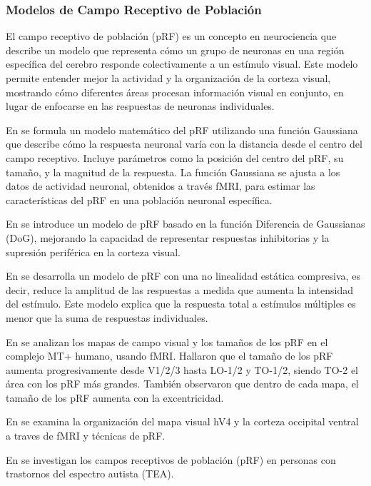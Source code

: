 \subsubsection*{Modelos de Campo Receptivo de Población} 

El campo receptivo de población (pRF) es un concepto en neurociencia que describe un modelo que representa cómo un grupo de neuronas en una región específica del cerebro responde colectivamente a un estímulo visual. Este modelo permite entender mejor la actividad y la organización de la corteza visual, mostrando cómo diferentes áreas procesan información visual en conjunto, en lugar de enfocarse en las respuestas de neuronas individuales. 

En \cite{dumoulin_population_2008} se formula un modelo matemático del pRF utilizando una función Gaussiana que describe cómo la respuesta neuronal varía con la distancia desde el centro del campo receptivo. Incluye parámetros como la posición del centro del pRF, su tamaño, y la magnitud de la respuesta. La función Gaussiana se ajusta a los datos de actividad neuronal, obtenidos a través fMRI, para estimar las características del pRF en una población neuronal específica.

En \cite{zuiderbaan_modeling_2012} se introduce un modelo de pRF basado en la función Diferencia de Gaussianas (DoG), mejorando la capacidad de representar respuestas inhibitorias y la supresión periférica en la corteza visual.

En \cite{kay_compressive_2013} se desarrolla un modelo de pRF con una no linealidad estática compresiva, es decir, reduce la amplitud de las respuestas a medida que aumenta la intensidad del estímulo. Este modelo explica que la respuesta total a estímulos múltiples es menor que la suma de respuestas individuales.

En \cite{amano_visual_2009} se analizan los mapas de campo visual y los tamaños de los pRF en el complejo MT+ humano, usando fMRI. Hallaron que el tamaño de los pRF aumenta progresivamente desde V1/2/3 hasta LO-1/2 y TO-1/2, siendo TO-2 el área con los pRF más grandes. También observaron que dentro de cada mapa, el tamaño de los pRF aumenta con la excentricidad. 

En \cite{winawer_mapping_2010} se examina la organización del mapa visual hV4 y la corteza occipital ventral a traves de fMRI y técnicas de pRF. 

En \cite{schwarzkopf_larger_2014} se investigan los campos receptivos de población (pRF) en personas con trastornos del espectro autista (TEA). 

